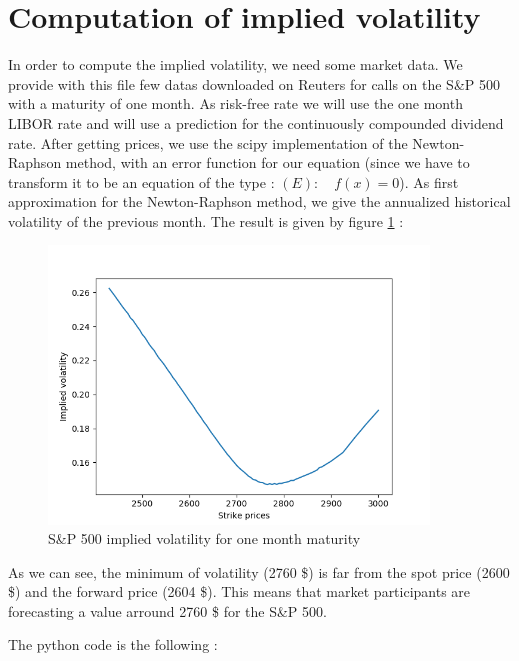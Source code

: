 \documentclass[hidelinks]{article}
\theoremstyle{definition}
\begin{document}
   \newpage
\appendix
\section{Computation of implied volatility}
\label{sec:iv_calculus}

In order to compute the implied volatility, we need some market data. We provide with this file few datas downloaded on Reuters for calls on the S\&P 500 with a maturity of one month. As risk-free rate we will use the one month LIBOR rate and will use a prediction for the continuously compounded dividend rate. After getting prices, we use the scipy implementation of the Newton-Raphson method, with an error function for our equation (since we have to transform it to be an equation of the type : $(E): \quad f(x) = 0$). As first approximation for the Newton-Raphson method, we give the annualized historical volatility of the previous month. The result is given by figure \ref{fig:sp_iv} :

\begin{figure}[!h]
	\centering
	\includegraphics[width=0.9\textwidth]{SP500_iv.png}
    \caption{S\&P 500 implied volatility for one month maturity}
    \label{fig:sp_iv}
    \end{figure}
    
    As we can see, the minimum of volatility (2760 \$) is far from the spot price (2600 \$) and the forward price (2604 \$). This means that market participants are forecasting a value arround 2760 \$ for the S\&P 500.
   
    The python code is the following :
    
    
\end{document}
